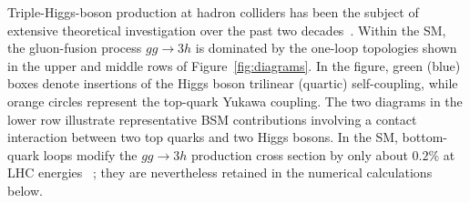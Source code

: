 \documentclass{SciPost}
\providecommand{\DIFaddtex}[1]{{\protect\color{red} #1}} %
\providecommand{\DIFdeltex}[1]{} %
\providecommand{\DIFaddbegin}{} %
\providecommand{\DIFaddend}{} %
\providecommand{\DIFdelbegin}{} %
\providecommand{\DIFdelend}{} %
\providecommand{\DIFadd}[1]{\texorpdfstring{\DIFaddtex{#1}}{#1}} %
\providecommand{\DIFdel}[1]{\texorpdfstring{\DIFdeltex{#1}}{}} %
\begin{document}
\DIFdelbegin \DIFdel{Triple-Higgs }\DIFdelend \DIFaddbegin \DIFadd{Triple-Higgs-boson }\DIFaddend production at hadron colliders has been the subject of extensive theoretical investigation over the past two decades~\cite{Plehn:2005nk,Binoth:2006ym,Maltoni:2014eza,Papaefstathiou:2015paa,Chen:2015gva,Fuks:2015hna,deFlorian:2016sit,Kilian:2017nio,Fuks:2017zkg,Bizon:2018syu,deFlorian:2019app,Stylianou:2023xit,Papaefstathiou:2023uum,Abouabid:2024gms,Dong:2025lkm,Haisch:2025pql,Campbell:2025llb,Fuks:2025gjv,Panizzi:2025sya,Ding:2026qto}. Within the SM, the gluon-fusion process $gg \to 3h$ is dominated by the one-loop topologies shown in the upper and middle rows of Figure~\ref{fig:diagrams}. In the figure, green (blue) boxes denote insertions of the Higgs \DIFaddbegin \DIFadd{boson }\DIFaddend trilinear (quartic) self-coupling, while orange circles represent the top-quark Yukawa coupling. The two diagrams in the lower row illustrate representative BSM contributions involving a contact interaction between two top quarks and two Higgs bosons. In the SM, bottom-quark loops \DIFdelbegin \DIFdel{contribute only about $-0.2\%$ to }\DIFdelend \DIFaddbegin \DIFadd{modify }\DIFaddend the $gg \to 3h$ production cross section \DIFaddbegin \DIFadd{by only about $0.2\%$ }\DIFaddend at LHC energies~\cite{Campbell:2025llb}\DIFdelbegin \DIFdel{. We therefore neglect all light-quark contributions throughout the remainder of this work}\DIFdelend \DIFaddbegin \DIFadd{; they are nevertheless retained in the numerical calculations below}\DIFaddend .
\end{document}
